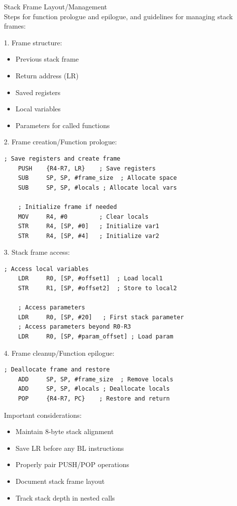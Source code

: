 \begin{KR}{Stack Frame Layout/Management}\\
Steps for function prologue and epilogue, and guidelines for managing stack frames:

1. Frame structure:
\begin{itemize}
  \item Previous stack frame
  \item Return address (LR)
  \item Saved registers
  \item Local variables
  \item Parameters for called functions
\end{itemize}

2. Frame creation/Function prologue:
\begin{lstlisting}[language=armasm, style=basesmol]
    ; Save registers and create frame
    PUSH    {R4-R7, LR}    ; Save registers
    SUB     SP, SP, #frame_size  ; Allocate space
    SUB     SP, SP, #locals ; Allocate local vars
    
    ; Initialize frame if needed
    MOV     R4, #0         ; Clear locals
    STR     R4, [SP, #0]   ; Initialize var1
    STR     R4, [SP, #4]   ; Initialize var2
\end{lstlisting}

3. Stack frame access:
\begin{lstlisting}[language=armasm, style=basesmol]
    ; Access local variables
    LDR     R0, [SP, #offset1]  ; Load local1
    STR     R1, [SP, #offset2]  ; Store to local2

    ; Access parameters
    LDR     R0, [SP, #20]   ; First stack parameter
    ; Access parameters beyond R0-R3
    LDR     R0, [SP, #param_offset] ; Load param
\end{lstlisting}

4. Frame cleanup/Function epilogue:
\begin{lstlisting}[language=armasm, style=basesmol]
    ; Deallocate frame and restore
    ADD     SP, SP, #frame_size  ; Remove locals
    ADD     SP, SP, #locals ; Deallocate locals
    POP     {R4-R7, PC}    ; Restore and return
\end{lstlisting}
\end{KR}

\begin{remark}
Important considerations:
\begin{itemize}
  \item Maintain 8-byte stack alignment
  \item Save LR before any BL instructions
  \item Properly pair PUSH/POP operations
  \item Document stack frame layout
  \item Track stack depth in nested calls
\end{itemize}
\end{remark}



